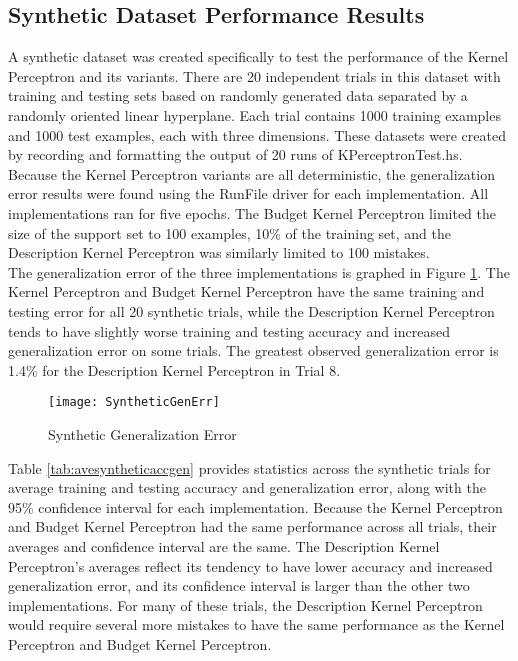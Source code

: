 \subsection{Synthetic Dataset Performance Results}\label{SyntheticResults}
A synthetic dataset was created specifically to test the performance of the Kernel Perceptron and its variants. There are 20 independent trials in this dataset with training and testing sets based on randomly generated data separated by a randomly oriented linear hyperplane. Each trial contains 1000 training examples and 1000 test examples, each with three dimensions. These datasets were created by recording and formatting the output of 20 runs of KPerceptronTest.hs. 
\\Because the Kernel Perceptron variants are all deterministic, the generalization error results were found using the RunFile driver for each implementation. All implementations ran for five epochs. The Budget Kernel Perceptron limited the size of the support set to 100 examples, 10\% of the training set, and the Description Kernel Perceptron was similarly limited to 100 mistakes. 
\\The generalization error of the three implementations is graphed in Figure \ref{SyntheticGenErrFig}. The Kernel Perceptron and Budget Kernel Perceptron have the same training and testing error for all 20 synthetic trials, while the Description Kernel Perceptron tends to have slightly worse training and testing accuracy and increased generalization error on some trials. The greatest observed generalization error is 1.4\% for the Description Kernel Perceptron in Trial 8.

\begin{figure}[h]\label{SyntheticGenErrFig}
 \caption{Synthetic Generalization Error}
 \begin{center}
  \texttt{[image: SyntheticGenErr]}
 \end{center}
\end{figure}

Table \ref{tab:avesyntheticaccgen} provides statistics across the synthetic trials for average training and testing accuracy and generalization error, along with the 95\% confidence interval for each implementation. Because the Kernel Perceptron and Budget Kernel Perceptron had the same performance across all trials, their averages and confidence interval are the same. The Description Kernel Perceptron's averages reflect its tendency to have lower accuracy and increased generalization error, and its confidence interval is larger than the other two implementations. For many of these trials, the Description Kernel Perceptron would require several more mistakes to have the same performance as the Kernel Perceptron and Budget Kernel Perceptron.


